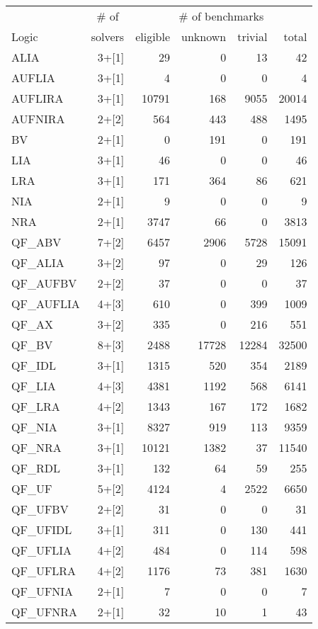 \documentclass[twosize,11pt]{article}
\begin{document}
\begin{table}
\centering
\begin{tabular}{|l|r|r|r|r|r|}
\hline
       & \multicolumn{1}{|c|}{\# of} & \multicolumn{4}{|c|}{\# of benchmarks} \\
 Logic & solvers & eligible & unknown  & trivial  & total  \\
\hline
ALIA & 3+[1] & 29 & 0 & 13 & 42 \\
AUFLIA & 3+[1] & 4 & 0 & 0 & 4\\
AUFLIRA & 3+[1] & 10791 & 168 & 9055 & 20014 \\
AUFNIRA & 2+[2] & 564 & 443 & 488 & 1495 \\
BV & 2+[1] & 0 & 191 & 0 & 191 \\
LIA & 3+[1] & 46 & 0 & 0 & 46 \\
LRA & 3+[1] & 171 & 364 & 86 & 621\\
NIA & 2+[1] & 9 & 0 & 0 & 9\\
NRA & 2+[1] & 3747 & 66 & 0 & 3813 \\
QF\_ABV & 7+[2] & 6457 & 2906 & 5728 & 15091 \\
QF\_ALIA & 3+[2] & 97 & 0 & 29 & 126 \\
QF\_AUFBV & 2+[2] & 37 & 0 & 0 & 37 \\
QF\_AUFLIA & 4+[3] & 610 & 0 & 399 & 1009\\
QF\_AX & 3+[2] & 335 & 0 & 216 & 551 \\
QF\_BV & 8+[3] & 2488 & 17728 & 12284 & 32500 \\
QF\_IDL & 3+[1] & 1315 & 520 & 354 & 2189 \\
QF\_LIA & 4+[3] & 4381 & 1192 & 568 & 6141 \\
QF\_LRA & 4+[2] & 1343 & 167 & 172 & 1682\\ 
QF\_NIA & 3+[1] & 8327 & 919 & 113 & 9359 \\
QF\_NRA & 3+[1] & 10121 & 1382 & 37 & 11540 \\
QF\_RDL & 3+[1] & 132 & 64 & 59 & 255 \\
QF\_UF & 5+[2] & 4124 & 4 & 2522 & 6650 \\
QF\_UFBV & 2+[2] & 31 & 0 & 0 & 31 \\
QF\_UFIDL & 3+[1] & 311 & 0 & 130 & 441\\
QF\_UFLIA & 4+[2] & 484 & 0 & 114 & 598 \\
QF\_UFLRA & 4+[2] & 1176 & 73 & 381 & 1630 \\
QF\_UFNIA & 2+[1] & 7 & 0 &0 & 7 \\
QF\_UFNRA & 2+[1] & 32 & 10 & 1 & 43\\

\end{tabular}
\end{table}
\end{document}
